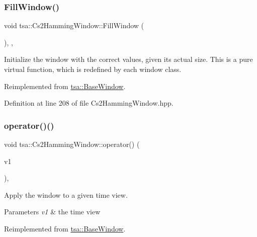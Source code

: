 \subsubsection{\texorpdfstring{Fill\+Window()}{FillWindow()}}
{\footnotesize\ttfamily void tsa\+::\+Cs2\+Hamming\+Window\+::\+Fill\+Window (\begin{DoxyParamCaption}{ }\end{DoxyParamCaption})\hspace{0.3cm}{\ttfamily [inline]}, {\ttfamily [private]}, {\ttfamily [virtual]}}

Initialize the window with the correct values, given its actual size. This is a pure virtual function, which is redefined by each window class. 

Reimplemented from \hyperlink{classtsa_1_1_base_window_aa74b29105d94caa521d308198e8e6643}{tsa\+::\+Base\+Window}.



Definition at line 208 of file Cs2\+Hamming\+Window.\+hpp.

\mbox{\label{classtsa_1_1_cs2_hamming_window_a41281794f2587c56ed52459fe0a106a2}} 
\subsubsection{\texorpdfstring{operator()()}{operator()()}\hspace{0.1cm}{\footnotesize\ttfamily [1/3]}}
{\footnotesize\ttfamily void tsa\+::\+Cs2\+Hamming\+Window\+::operator() (\begin{DoxyParamCaption}\item[{\hyperlink{namespacetsa_ac599574bcc094eda25613724b8f3ca9e}{Seq\+View\+Double} \&}]{v1 }\end{DoxyParamCaption})\hspace{0.3cm}{\ttfamily [inline]}, {\ttfamily [virtual]}}

Apply the window to a given time view.


\begin{DoxyParams}{Parameters}
{\em v1} & the time view \\
\hline
\end{DoxyParams}


Reimplemented from \hyperlink{classtsa_1_1_base_window_a05d9edb95dc01840a1b2df78dfa3a8c1}{tsa\+::\+Base\+Window}.



